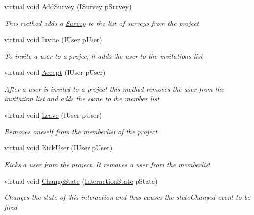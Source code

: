 \begin{DoxyCompactItemize}
virtual void \hyperlink{class_plex_byte_1_1_mo_cap_1_1_interactions_1_1_project_af374761c89f59d42b1a79fdb5cf0311d}{Add\+Survey} (\hyperlink{interface_plex_byte_1_1_mo_cap_1_1_interactions_1_1_i_survey}{I\+Survey} p\+Survey)
\begin{DoxyCompactList}\small\item\em This method adds a \hyperlink{class_plex_byte_1_1_mo_cap_1_1_interactions_1_1_survey}{Survey} to the list of surveys from the project \end{DoxyCompactList}\item 
virtual void \hyperlink{class_plex_byte_1_1_mo_cap_1_1_interactions_1_1_project_a44b3e36d693cffce67d606f2f040927e}{Invite} (I\+User p\+User)
\begin{DoxyCompactList}\small\item\em To invite a user to a projec, it adds the user to the invitations list \end{DoxyCompactList}\item 
virtual void \hyperlink{class_plex_byte_1_1_mo_cap_1_1_interactions_1_1_project_a06b884b97b543b4c8ba64993e4008a6f}{Accept} (I\+User p\+User)
\begin{DoxyCompactList}\small\item\em After a user is invited to a project this method removes the user from the invitation list and adds the same to the member list \end{DoxyCompactList}\item 
virtual void \hyperlink{class_plex_byte_1_1_mo_cap_1_1_interactions_1_1_project_a12152d11fc38eedc1b93dd56ee73f42c}{Leave} (I\+User p\+User)
\begin{DoxyCompactList}\small\item\em Removes oneself from the memberlist of the project \end{DoxyCompactList}\item 
virtual void \hyperlink{class_plex_byte_1_1_mo_cap_1_1_interactions_1_1_project_a0fe352bded53612ae6e23859b0ce8802}{Kick\+User} (I\+User p\+User)
\begin{DoxyCompactList}\small\item\em Kicks a user from the project. It removes a user from the memberlist \end{DoxyCompactList}\item 
virtual void \hyperlink{class_plex_byte_1_1_mo_cap_1_1_interactions_1_1_project_a7a916aeebe04d4dd33765b6127282543}{Change\+State} (\hyperlink{namespace_plex_byte_1_1_mo_cap_1_1_interactions_afcb673d9186608b6bd3b187179aedc8a}{Interaction\+State} p\+State)
\begin{DoxyCompactList}\small\item\em Changes the state of this interaction and thus causes the state\+Changed event to be fired \end{DoxyCompactList}\end{DoxyCompactItemize}
